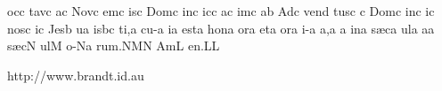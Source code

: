 \sgn {}oc\punctum c\egn
\sgn tav\punctum c\egn
\sgn {}a{}\punctum c\egn
\spatium
\sgn Nov\punctum c\egn
\sgn {}em\punctum c\egn
{}is\punctum c\egn
\spatium
\sgn Dom\punctum c\egn
\sgn {}in\punctum c\egn
\sgn {}ic\punctum c\egn
\sgn {}a{}\punctum c\egn
\spatium
{}im\punctum c\egn
\sgn {}a{}\punctum b\egn
\spatium
\sgn {}Ad\punctum c\egn
\sgn ven\punctum d\egn
\sgn tus\punctum c\egn
\spatium
\custos c
\lineaproxima
\sgn Dom\punctum c\egn
\sgn {}in\punctum c\egn
\sgn {}i{}\punctum c\egn
\spatium
\sgn nos\punctum c\egn
{}i{}\punctum c\egn
\spatium
\sgn Jes\punctum b\egn
\sgn {}u{}\punctum a\egn
\spatium
{}is\pes bc\egn
\sgn ti,\punctum a\egn
\spatium
\divisiominima
\spatium
\sgn cu-\punctum a\egn
\sgn {}i{}\punctum a\egn
\spatium
\sgn {}e{st}\punctum a\egn
\spatium
\sgn hon\punctum a\egn
\sgn {}or\punctum a\egn
\spatium
\sgn {}et\punctum a\egn
\spatium
{}or\punctum a\egn
\sgn {}i-\punctum a\egn
\sgn {}a,\punctum a\egn
\spatium
\custos a
\lineaproxima
\sgn {}in\punctum a\egn
\spatium
\sgn s{\ae}c\punctum a\egn
\sgn {}ul\punctum a\egn
\sgn {}a{}\punctum a\egn
\spatium
\sgn s{\ae}c\punctum N\egn
\sgn {}ul\punctum M\egn
\sgn {}o-\pes Na\egn
\sgn ru{m.}\clivis NM\augmentum N\egn
\spatium
\divisiomaior
\spatium
\sgn {}Am\punctum L\egn
\sgn {}e{n.}\punctum L\augmentum L\egn
\spatium
\Finisgregoriana

\vfill

\centerline{http://www.brandt.id.au}

\eject

\bye
